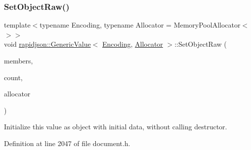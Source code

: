 \subsubsection{\texorpdfstring{SetObjectRaw()}{SetObjectRaw()}}
{\footnotesize\ttfamily template$<$typename Encoding, typename Allocator = Memory\+Pool\+Allocator$<$$>$$>$ \\
void \mbox{\hyperlink{classrapidjson_1_1_generic_value}{rapidjson\+::\+Generic\+Value}}$<$ \mbox{\hyperlink{classrapidjson_1_1_encoding}{Encoding}}, \mbox{\hyperlink{classrapidjson_1_1_allocator}{Allocator}} $>$\+::Set\+Object\+Raw (\begin{DoxyParamCaption}\item[{\mbox{\hyperlink{classrapidjson_1_1_generic_value_a0220ddebe2f023fa75b643a50e90e559}{Member}} $\ast$}]{members,  }\item[{\mbox{\hyperlink{namespacerapidjson_a44eb33eaa523e36d466b1ced64b85c84}{Size\+Type}}}]{count,  }\item[{\mbox{\hyperlink{classrapidjson_1_1_allocator}{Allocator}} \&}]{allocator }\end{DoxyParamCaption})}



Initialize this value as object with initial data, without calling destructor. 



Definition at line 2047 of file document.\+h.


